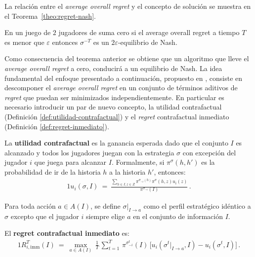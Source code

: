 La relación entre el \textit{average overall regret} y el concepto de solución se muestra en el Teorema~\ref{theo:regret-nash}.
\begin{theorem}
\label{theo:regret-nash}
En un juego de $2$ jugadores de suma cero si el average overall regret a tiempo $T$ es menor que $\varepsilon$ entonces $\sigma^{-T}$ es un $2\varepsilon$-equilibrio de Nash.
\end{theorem}

Como consecuencia del teorema anterior se obtiene que un algoritmo que lleve el \textit{average overall regret} a cero, conducirá a un equilibrio de Nash. La idea fundamental del enfoque presentado a continuación, propuesto en \cite{bib:cfr}, consiste en descomponer el \textit{average overall regret} en un conjunto de términos aditivos de \textit{regret} que puedan ser minimizados independientemente. En particular es necesario introducir un par de nuevo concepto, la utilidad contrafactual (Definición \ref{def:utilidad-contrafactual}) y el \textit{regret} contrafactual inmediato (Definición \ref{def:regret-inmediato}).

\begin{definition}
\label{def:utilidad-contrafactual}
La \textbf{utilidad contrafactual} es la ganancia esperada dado que el conjunto $I$ es alcanzado y todos los jugadores juegan con la estrategia $\sigma$ con excepción del jugador $i$ que juega para alcanzar $I$. Formalmente, si $\pi^{\sigma}(h, h')$ es la probabilidad de ir de la historia $h$ a la historia $h'$, entonces:
\begin{alignat}{1}
u_i(\sigma, I)\ =\ \frac{\sum_{h \in I, z \in Z} \pi^{\sigma_{-i}(h)} \pi^{\sigma}(h, z) u_i(z)}{\pi^{\sigma_{-i}}(I)} \,.
\end{alignat}
\end{definition}

Para toda acción $a \in A(I)$, se define $\sigma|_{I \rightarrow a}$ como el perfil estratégico idéntico a $\sigma$ excepto que el jugador $i$ siempre elige $a$ en el conjunto de información $I$.

\begin{definition}
\label{def:regret-inmediato}
El \textbf{regret contrafactual inmediato} es:
\begin{alignat}{1}
R_{i, \text{imm}}^T(I)\ =\  \max_{a \in A(I)} \, \frac{1}{T} \, \sum_{t = 1}^T \, \pi^{\sigma_{-i}^t}(I) \, \bigl[ u_i(\sigma^t|_{I \rightarrow a}, I) - u_i(\sigma^t, I) \bigr]\,.
\end{alignat}
\end{definition}

